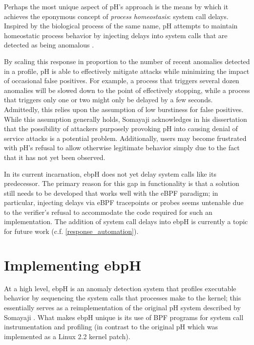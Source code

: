 \documentclass[
  12pt]{findlay}
\begin{document}
Perhaps the most unique aspect of pH's approach is the means by which it
achieves the eponymous concept of \emph{process homeostasis}: system
call delays. Inspired by the biological process of the same name, pH
attempts to maintain homeostatic process behavior by injecting delays
into system calls that are detected as being anomalous
\autocite{soma02}.

By scaling this response in proportion to the number of recent anomalies
detected in a profile, pH is able to effectively mitigate attacks while
minimizing the impact of occasional false positives. For example, a
process that triggers several dozen anomalies will be slowed down to the
point of effectively stopping, while a process that triggers only one or
two might only be delayed by a few seconds. Admittedly, this relies upon
the assumption of low burstiness for false positives. While this
assumption generally holds, Somayaji acknowledges in his dissertation
\autocite{soma02} that the possibility of attackers purposely provoking
pH into causing denial of service attacks is a potential problem.
Additionally, users may become frustrated with pH's refusal to allow
otherwise legitimate behavior simply due to the fact that it has not yet
been observed.

In its current incarnation, ebpH does not yet delay system calls like
its predecessor. The primary reason for this gap in functionality is
that a solution still needs to be developed that works well with the
eBPF paradigm; in particular, injecting delays via eBPF tracepoints or
probes seems untenable due to the verifier's refusal to accommodate the
code required for such an implementation. The addition of system call
delays into ebpH is currently a topic for future work (c.f.
\autoref{response_automation}).

\hypertarget{implementing-ebph}{%
\section{Implementing ebpH}\label{implementing-ebph}}

At a high level, ebpH is an anomaly detection system that profiles
executable behavior by sequencing the system calls that processes make
to the kernel; this essentially serves as a reimplementation of the
original pH system described by Somayaji \autocite{soma02}. What makes
ebpH unique is its use of BPF programs for system call instrumentation
and profiling (in contrast to the original pH which was implemented as a
Linux 2.2 kernel patch).
\end{document}

